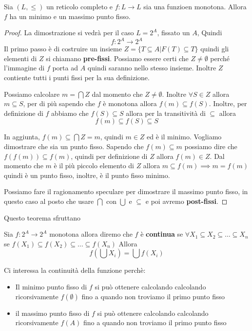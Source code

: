 \begin{teorema}
    Sia $(L,\le)$ un reticolo completo e $f:L\to L$ sia una funzioen monotona.
    Allora $f$ ha un minimo e un massimo punto fisso.
    \begin{proof}
        La dimostrazione si vedrà per il caso $L=2^A$, fissato un $A$, Quindi
        $$f:2^A\to 2^A$$
        Il primo passo è di costruire un insieme $Z=\{T\subseteq A | F(T)\subseteq T\}$
        quindi gli elementi di $Z$ si chiamano \textbf{pre-fissi}. Possiamo essere certi
        che $Z\ne \emptyset$ perché l'immagine di $f$ porta ad $A$ quindi saranno 
        nello stesso insieme. Inoltre $Z$ contiente tutti i punti fissi per la sua definizione.

        Possiamo calcolare $m=\bigcap Z$ dal momento che $Z\ne \emptyset$. Inoltre
        $\forall S\in Z$ allora $m\subseteq S$, per di più sapendo che $f$ è monotona
        allora $f(m)\subseteq f(S)$. Inoltre, per definizione di $f$ abbiamo che
        $f(S)\subseteq S$ allora per la transitività di $\subseteq$ allora 
        $$f(m)\subseteq f(S)\subseteq S$$

        In aggiunta, $f(m)\subseteq \bigcap Z= m$, quindi $m\in Z$ ed è il minimo.
        Vogliamo dimostrare che sia un punto fisso. Sapendo che $f(m)\subseteq m$
        possiamo dire che $f(f(m))\subseteq f(m)$, quindi per definizione di $Z$
        allora $f(m)\in Z$. Dal momento che $m$ è il più piccolo elemento di $Z$ 
        allora $m\subseteq f(m)\implies m =f(m)$ quindi è un punto fisso, inoltre,
        è il punto fisso minimo.

        Possiamo fare il ragionamento speculare per dimostrare il massimo punto
        fisso, in questo caso al posto che usare $\bigcap$ con $\bigcup$ e $\subseteq$
        e poi avremo \textbf{post-fissi}.
    \end{proof} 
\end{teorema}

Questo teorema sfruttano
\begin{teorema}
    Sia $f:2^A\to 2^A$ monotona allora diremo che $f$ è \textbf{continua} se
    $\forall X_1\subseteq X_2\subseteq \dots \subseteq X_n$ se 
    $f(X_1)\subseteq f(X_2)\subseteq \dots \subseteq f(X_n)$ 
    Allora
    $$f(\bigcup X_i)=\bigcup f(X_i)$$
\end{teorema}
Ci interessa la continuità della funzione perchè:
\begin{itemize}
    \item Il minimo punto fisso di $f$ si può ottenere calcolando 
    calcolando ricorsivamente $f(\emptyset)$ fino a quando non troviamo il primo 
    punto fisso
    \item il massimo punto fisso di $f$ si può ottenere calcolando 
    calcolando ricorsivamente $f(A)$ fino a quando non troviamo il primo punto
    fisso
\end{itemize}

